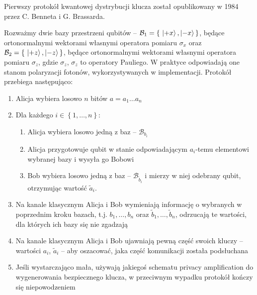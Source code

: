 \documentclass[10pt]{article}
\begin{document}
Pierwszy\cite{Scarani09} protokół kwantowej dystrybucji klucza został opublikowany w 1984 przez
C. Benneta i G. Brassarda\cite{bb84}. 

Rozważmy dwie bazy przestrzeni qubitów -- \(\mathcal{B}_1 = \left\{\ \Ket{+x}, \Ket{-x}\,\right\}\), 
będące ortonormalnymi wektorami własnymi operatora pomiaru \(\sigma_x\) oraz 
\(\mathcal{B}_2 = \left\{\ \Ket{+z}, \Ket{-z}\,\right\}\), będące ortonormalnymi wektorami własnymi
operatora pomiaru \(\sigma_z\), gdzie \(\sigma_z\), \(\sigma_z\) to operatory Pauliego. W praktyce
odpowiadają one stanom polaryzacji fotonów, wykorzystywanych w implementacji. Protokół przebiega 
następująco:

\begin{enumerate}
  \item Alicja wybiera losowo \(n\) bitów \(a=a_1\ldots a_n\)
  \item Dla każdego \(i\in\left\{1,\ldots,n\right\}\):
    \begin{enumerate}
      \item Alicja wybiera losowo jedną z baz -- \(\mathcal{B}_{b_i}\)
      \item Alicja przygotowuje qubit w stanie odpowiadającym \(a_i\)-temu elementowi wybranej
        bazy i wysyła go Bobowi
      \item Bob wybiera losowo jedną z baz -- \(\mathcal{B}_{\tilde{b}_i}\) i mierzy w niej
        odebrany qubit, otrzymując wartość \(\tilde{a}_i\).
    \end{enumerate}
  \item Na kanale klasycznym Alicja i Bob wymieniają informację o wybranych w poprzednim
    kroku bazach, t.j. \(b_1,\ldots,b_n\) oraz \(\tilde{b}_1,\ldots,\tilde{b}_n\), odrzucają te
    wartości, dla których ich bazy się nie zgadzają
  \item Na kanale klasycznym Alicja i Bob ujawniają pewną część swoich kluczy -- wartości 
    \(a_i\), \(\tilde{a}_i\) -- aby oszacować, jaka część komunikacji została podsłuchana
  \item Jeśli wystarczająco mała, używają jakiegoś schematu privacy amplification do wygenerowania
    bezpiecznego klucza, w przeciwnym wypadku protokół kończy się niepowodzeniem
\end{enumerate}
\end{document}
